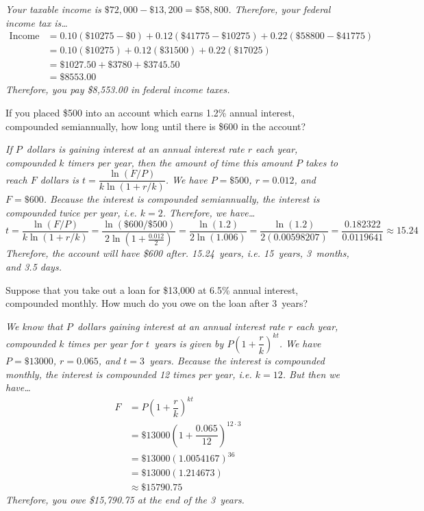 \documentclass[12pt,letterpaper]{exam}
\begin{document}
\begin{questions}
{\itshape 
Your taxable income is $\$72,000 - \$13,200= \$58,800$. Therefore, your federal income tax is\dots
	\[
	\begin{aligned}
	\text{Income Tax}&= 0.10(\$10275 - \$0) + 0.12(\$41775 - \$10275) + 0.22(\$58800 - \$41775) \\[0.3cm]
	&= 0.10(\$10275) + 0.12(\$31500) + 0.22(\$17025) \\[0.3cm]
	&= \$1027.50 + \$3780 + \$3745.50 \\[0.3cm]
	&= \$8553.00
	\end{aligned}
	\]
Therefore, you pay \$8,553.00 in federal income taxes. 
}



\newpage
\question[10] If you placed \$500 into an account which earns 1.2\% annual interest, compounded semiannually, how long until there is \$600 in the account? \pspace

{\itshape
If $P$~dollars is gaining interest at an annual interest rate $r$ each year, compounded $k$ timers per year, then the amount of time this amount $P$ takes to reach $F$ dollars is $t= \dfrac{\ln(F/P)}{k \ln(1 + r/k)}$. We have $P= \$500$, $r= 0.012$, and $F= \$600$. Because the interest is compounded semiannually, the interest is compounded twice per year, i.e. $k= 2$. Therefore, we have\dots
	\[
	t= \dfrac{\ln(F/P)}{k \ln(1 + r/k)}= \dfrac{\ln(\$600/\$500)}{2 \ln \left(1 + \frac{0.012}{2} \right)}= \dfrac{\ln(1.2)}{2 \ln(1.006)}= \dfrac{\ln(1.2)}{2(0.00598207)}= \dfrac{0.182322}{0.0119641} \approx 15.24
	\]
Therefore, the account will have \$600 after. 15.24~years, i.e. 15~years, 3~months, and 3.5 days. 
}



\newpage
\question[10] Suppose that you take out a loan for \$13,000 at 6.5\% annual interest, compounded monthly. How much do you owe on the loan after 3~years? \pspace

{\itshape
We know that $P$~dollars gaining interest at an annual interest rate $r$ each year, compounded $k$ times per year for $t$~years is given by $P \left(1 + \dfrac{r}{k} \right)^{kt}$. We have $P= \$13000$, $r= 0.065$, and $t= 3$~years. Because the interest is compounded monthly, the interest is compounded 12 times per year, i.e. $k= 12$. But then we have\dots
	\[
	\begin{aligned}
	F&= P \left(1 + \dfrac{r}{k} \right)^{kt} \\[0.3cm]
	&= \$13000 \left(1 + \dfrac{0.065}{12} \right)^{12 \cdot 3} \\[0.3cm]
	&= \$13000 (1.0054167)^{36} \\[0.3cm]
	&= \$13000 (1.214673) \\[0.3cm]
	&\approx \$15790.75
	\end{aligned}
	\]
Therefore, you owe \$15,790.75 at the end of the 3~years. 
}




\end{questions}
\end{document}

